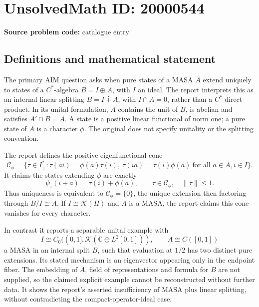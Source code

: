 \documentclass[11pt]{article}
\newcommand{\C}{\mathbb{C}}
\begin{document}
\section*{UnsolvedMath ID: 20000544}
\textbf{Source problem code:} catalogue entry
\subsection{Definitions and mathematical statement}
The primary AIM question asks when pure states of a MASA $A$ extend uniquely to states of a $C^*$-algebra $B=I\oplus A$, with $I$ an ideal. The report interprets this as an internal linear splitting $B=I\dotplus A$, with $I\cap A=0$, rather than a $C^*$ direct product. In its unital formulation, $A$ contains the unit of $B$, is abelian and satisfies $A'\cap B=A$. A state is a positive linear functional of norm one; a pure state of $A$ is a character $\phi$. The original does not specify unitality or the splitting convention.

The report defines the positive eigenfunctional cone
\[
 \mathcal C_\phi=\{\tau\in I^*_+:\tau(ai)=\phi(a)\tau(i),\
 \tau(ia)=\tau(i)\phi(a)\ \text{for all }a\in A,i\in I\}.
\]
It claims the states extending $\phi$ are exactly
\[
 \psi_\tau(i+a)=\tau(i)+\phi(a),\qquad
 \tau\in\mathcal C_\phi,\quad\|\tau\|\leq1.
\]
Thus uniqueness is equivalent to $\mathcal C_\phi=\{0\}$, the unique extension then factoring through $B/I\cong A$. If $I\cong\mathcal K(H)$ and $A$ is a MASA, the report claims this cone vanishes for every character.

In contrast it reports a separable unital example with
\[
 I\cong C_0((0,1],\mathcal K(\C\oplus L^2[0,1])),\qquad A\cong C([0,1])
\]
a MASA in an internal split $B$, such that evaluation at $1/2$ has two distinct pure extensions. Its stated mechanism is an eigenvector appearing only in the endpoint fiber. The embedding of $A$, field of representations and formula for $B$ are not supplied, so the claimed explicit example cannot be reconstructed without further data. It shows the report's asserted insufficiency of MASA plus linear splitting, without contradicting the compact-operator-ideal case.
\end{document}
